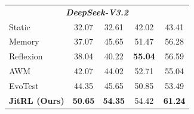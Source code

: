\begin{table}[t]
\begin{center}
\begin{small}
\begin{tabular}{lcccc}
          \midrule
          \multicolumn{5}{c}{\textit{\textbf{DeepSeek-V3.2}}} \\ \addlinespace[2pt]
          Static & 32.07 & 32.61 & 42.02 & 43.41 \\
          Memory & 37.07 & 45.65 & 51.47 & 56.28 \\
          Reflexion & 38.04 & 40.22 & \textbf{55.04} & 56.59 \\
          AWM & 42.07 & 44.02 & 52.71 & 55.04 \\
          EvoTest & 44.35 & 45.65 & 50.85 & 53.49 \\
          \textbf{JitRL (Ours)} & \textbf{50.65} & \textbf{54.35} & 54.42 & \textbf{61.24} \\
          \bottomrule
        \end{tabular}
    \end{small}
  \end{center}
  \vskip -0.1in
\vspace{-4mm}
\end{table}
